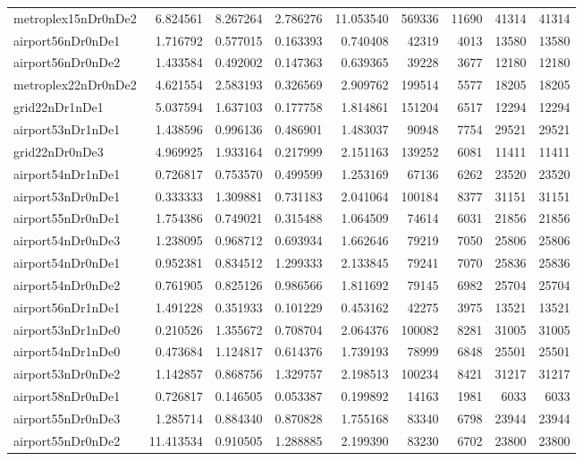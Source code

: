 \begin{longtable}{|l|r|r|r|r|r|r|r|r|}
metroplex15nDr0nDe2 & 6.824561 & 8.267264 & 2.786276 & 11.053540 & 569336 & 11690 & 41314 & 41314 \\
airport56nDr0nDe1 & 1.716792 & 0.577015 & 0.163393 & 0.740408 & 42319 & 4013 & 13580 & 13580 \\
airport56nDr0nDe2 & 1.433584 & 0.492002 & 0.147363 & 0.639365 & 39228 & 3677 & 12180 & 12180 \\
metroplex22nDr0nDe2 & 4.621554 & 2.583193 & 0.326569 & 2.909762 & 199514 & 5577 & 18205 & 18205 \\
grid22nDr1nDe1 & 5.037594 & 1.637103 & 0.177758 & 1.814861 & 151204 & 6517 & 12294 & 12294 \\
airport53nDr1nDe1 & 1.438596 & 0.996136 & 0.486901 & 1.483037 & 90948 & 7754 & 29521 & 29521 \\
grid22nDr0nDe3 & 4.969925 & 1.933164 & 0.217999 & 2.151163 & 139252 & 6081 & 11411 & 11411 \\
airport54nDr1nDe1 & 0.726817 & 0.753570 & 0.499599 & 1.253169 & 67136 & 6262 & 23520 & 23520 \\
airport53nDr0nDe1 & 0.333333 & 1.309881 & 0.731183 & 2.041064 & 100184 & 8377 & 31151 & 31151 \\
airport55nDr0nDe1 & 1.754386 & 0.749021 & 0.315488 & 1.064509 & 74614 & 6031 & 21856 & 21856 \\
airport54nDr0nDe3 & 1.238095 & 0.968712 & 0.693934 & 1.662646 & 79219 & 7050 & 25806 & 25806 \\
airport54nDr0nDe1 & 0.952381 & 0.834512 & 1.299333 & 2.133845 & 79241 & 7070 & 25836 & 25836 \\
airport54nDr0nDe2 & 0.761905 & 0.825126 & 0.986566 & 1.811692 & 79145 & 6982 & 25704 & 25704 \\
airport56nDr1nDe1 & 1.491228 & 0.351933 & 0.101229 & 0.453162 & 42275 & 3975 & 13521 & 13521 \\
airport53nDr1nDe0 & 0.210526 & 1.355672 & 0.708704 & 2.064376 & 100082 & 8281 & 31005 & 31005 \\
airport54nDr1nDe0 & 0.473684 & 1.124817 & 0.614376 & 1.739193 & 78999 & 6848 & 25501 & 25501 \\
airport53nDr0nDe2 & 1.142857 & 0.868756 & 1.329757 & 2.198513 & 100234 & 8421 & 31217 & 31217 \\
airport58nDr0nDe1 & 0.726817 & 0.146505 & 0.053387 & 0.199892 & 14163 & 1981 & 6033 & 6033 \\
airport55nDr0nDe3 & 1.285714 & 0.884340 & 0.870828 & 1.755168 & 83340 & 6798 & 23944 & 23944 \\
airport55nDr0nDe2 & 11.413534 & 0.910505 & 1.288885 & 2.199390 & 83230 & 6702 & 23800 & 23800 \\

\end{longtable}
